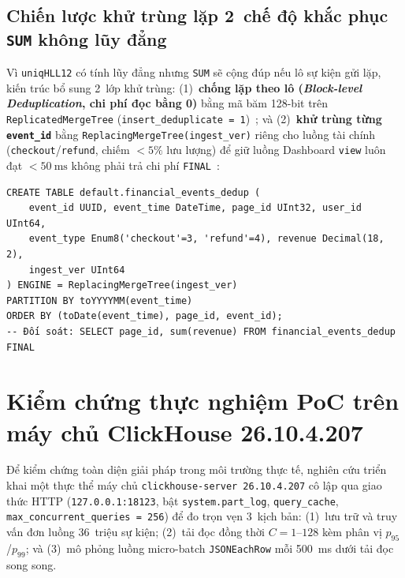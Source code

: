 \documentclass[13pt,a4paper]{report}
\begin{document}
\subsection{Chiến lược khử trùng lặp 2~chế độ khắc phục \texttt{SUM} không lũy đẳng}
Vì \texttt{uniqHLL12} có tính lũy đẳng nhưng \texttt{SUM} sẽ cộng đúp nếu lô sự kiện gửi lặp, kiến trúc bổ sung 2~lớp khử trùng: (1)~\textbf{chống lặp theo lô (\textit{Block-level Deduplication}, chi phí đọc bằng 0)} bằng mã băm 128-bit trên \texttt{ReplicatedMergeTree} (\texttt{insert\_\allowbreak{}deduplicate = 1})~\cite{V4}; và (2)~\textbf{khử trùng từng \texttt{event\_\allowbreak{}id}} bằng \texttt{ReplacingMergeTree(\allowbreak{}ingest\_\allowbreak{}ver)} riêng cho luồng tài chính (\texttt{checkout}/\texttt{refund}, chiếm $< 5\%$ lưu lượng) để giữ luồng Dashboard \texttt{view} luôn đạt $< 50~\text{ms}$ không phải trả chi phí \texttt{FINAL}~\cite{V1, P11}:

\begin{tcolorbox}[sqlblock]
\setlength{\topsep}{0pt}\setlength{\partopsep}{0pt}\footnotesize{}
\begin{verbatim}
CREATE TABLE default.financial_events_dedup (
    event_id UUID, event_time DateTime, page_id UInt32, user_id UInt64,
    event_type Enum8('checkout'=3, 'refund'=4), revenue Decimal(18, 2),
    ingest_ver UInt64
) ENGINE = ReplacingMergeTree(ingest_ver)
PARTITION BY toYYYYMM(event_time)
ORDER BY (toDate(event_time), page_id, event_id);
-- Đối soát: SELECT page_id, sum(revenue) FROM financial_events_dedup FINAL
\end{verbatim}
\end{tcolorbox}

\section{Kiểm chứng thực nghiệm PoC trên máy chủ ClickHouse 26.10.4.207}
Để kiểm chứng toàn diện giải pháp trong môi trường thực tế, nghiên cứu triển khai một thực thể máy chủ \texttt{clickhouse-server 26.10.4.207} cô lập qua giao thức HTTP (\texttt{127.0.0.1:18123}, bật \texttt{system.\allowbreak{}part\_\allowbreak{}log}, \texttt{query\_\allowbreak{}cache}, \texttt{max\_\allowbreak{}concurrent\_\allowbreak{}queries = 256}) để đo trọn vẹn 3~kịch bản: (1)~lưu trữ và truy vấn đơn luồng 36~triệu sự kiện; (2)~tải đọc đồng thời $C = 1\text{--}128$ kèm phân vị $p_{95}$/$p_{99}$; và (3)~mô phỏng luồng micro-batch \texttt{JSONEachRow} mỗi 500~ms dưới tải đọc song song.
\end{document}
